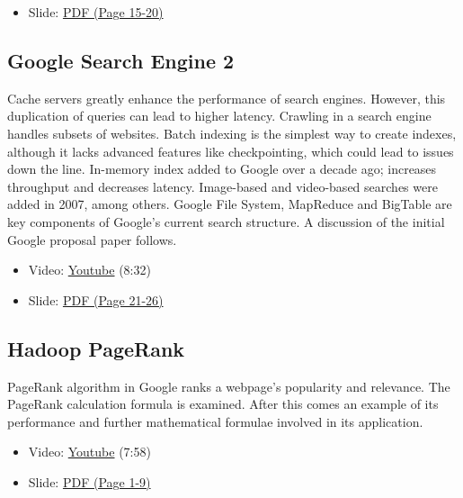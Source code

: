 \begin{itemize}
\tightlist
\item
  Slide:
  \href{https://drive.google.com/open?id=0B88HKpainTSfYWZ0dDlrNThkVms}{PDF
  (Page 15-20)}
\end{itemize}

\subsection{Google Search Engine 2}\label{google-search-engine-2}

Cache servers greatly enhance the performance of search engines.
However, this duplication of queries can lead to higher latency.
Crawling in a search engine handles subsets of websites. Batch indexing
is the simplest way to create indexes, although it lacks advanced
features like checkpointing, which could lead to issues down the line.
In-memory index added to Google over a decade ago; increases throughput
and decreases latency. Image-based and video-based searches were added
in 2007, among others. Google File System, MapReduce and BigTable are
key components of Google's current search structure. A discussion of the
initial Google proposal paper follows.

\begin{itemize}
\tightlist
\item
  Video: \href{https://www.youtube.com/watch?v=pxos3Yt6y6I}{Youtube}
  (8:32)
\end{itemize}

\begin{itemize}
\tightlist
\item
  Slide:
  \href{https://drive.google.com/open?id=0B88HKpainTSfYWZ0dDlrNThkVms}{PDF
  (Page 21-26)}
\end{itemize}

\subsection{Hadoop PageRank}\label{hadoop-pagerank}

PageRank algorithm in Google ranks a webpage's popularity and relevance.
The PageRank calculation formula is examined. After this comes an
example of its performance and further mathematical formulae involved in
its application.

\begin{itemize}
\tightlist
\item
  Video: \href{https://www.youtube.com/watch?v=GCp5OLLOrH0}{Youtube}
  (7:58)
\item
  Slide:
  \href{https://drive.google.com/open?id=0B88HKpainTSfWFpEZGxqSWRTYms}{PDF
  (Page 1-9)}
\end{itemize}


